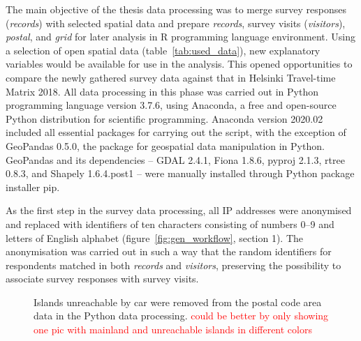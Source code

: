 The main objective of the thesis data processing was to merge survey responses (\textit{records}) with selected spatial data and prepare \textit{records}, survey visits (\textit{visitors}), \textit{postal}, and \textit{grid} for later analysis in R programming language environment. Using a selection of open spatial data (table~\ref{tab:used_data}), new explanatory variables would be available for use in the analysis. This opened opportunities to compare the newly gathered survey data against that in Helsinki Travel-time Matrix 2018. All data processing in this phase was carried out in Python programming language version 3.7.6, using Anaconda, a free and open-source Python distribution for scientific programming. Anaconda version 2020.02 included all essential packages for carrying out the script, with the exception of GeoPandas 0.5.0, the package for geospatial data manipulation in Python. GeoPandas and its dependencies -- GDAL 2.4.1, Fiona 1.8.6, pyproj 2.1.3, rtree 0.8.3, and Shapely 1.6.4.post1 -- were manually installed through Python package installer pip.

As the first step in the survey data processing, all IP addresses were anonymised and replaced with identifiers of ten characters consisting of numbers 0--9 and letters of English alphabet (figure~\ref{fig:gen_workflow}, section 1). The anonymisation was carried out in such a way that the random identifiers for respondents matched in both \textit{records} and \textit{visitors}, preserving the possibility to associate survey responses with survey visits. 

\begin{figure}[H]%
    \centering
    \quad
    \caption[Process to remove islands not reachable by car]{Islands unreachable by car were removed from the postal code area data in the Python data processing. \textcolor{red}{could be better by only showing one pic with mainland and unreachable islands in different colors}}%
    \label{fig:paavo_resarea}%
\end{figure}

